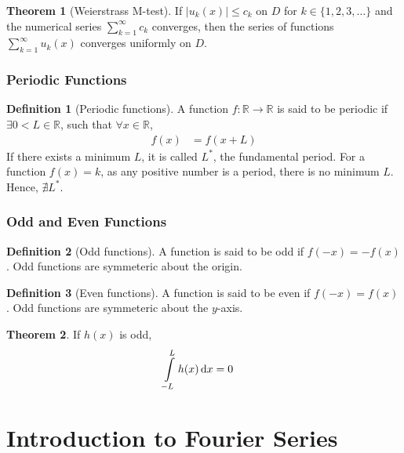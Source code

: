 \documentclass[fleqn, a4paper, 12pt, twoside]{article}
\theoremstyle{definition}
\newtheorem{definition}{Definition}
\theoremstyle{theorem}
\newtheorem{theorem}{Theorem}
\begin{document}
\begin{theorem}[Weierstrass M-test]
	If $|u_k(x)| \le c_k$ on $D$ for $k \in \{ 1, 2, 3, \dots \}$ and the numerical series $\sum\limits_{k = 1}^{\infty} c_k$ converges, then the series of functions $\sum\limits_{k = 1}^{\infty} u_k(x)$ converges uniformly on $D$.
	\label{Weierstrass_M-test}
\end{theorem}

\section{Periodic Functions}

\begin{definition}[Periodic functions]
	A function $f : \mathbb{R} \to \mathbb{R}$ is said to be periodic if $\exists 0 < L \in \mathbb{R}$, such that $\forall x \in \mathbb{R}$,
	\begin{align*}
		f(x) & = f(x + L)
	\end{align*}
	If there exists a minimum $L$, it is called $L^*$, the fundamental period.
	\marginnote
	{
		For a function $f(x) = k$, as any positive number is a period, there is no minimum $L$.
		Hence, $\nexists L^*$.
	}
\end{definition}

\section{Odd and Even Functions}


\begin{definition}[Odd functions]
	A function is said to be odd if $f(-x) = -f(x)$.
	\marginnote
	{
		Odd functions are symmeteric about the origin.
	}
\end{definition}

\begin{definition}[Even functions]
	A function is said to be even if $f(-x) = f(x)$.
	\marginnote
	{
		Odd functions are symmeteric about the $y$-axis.
	}
\end{definition}

\begin{theorem}
	If $h(x)$ is odd,
	\begin{align*}
		\int\limits_{-L}^{L} h(x) \dif x & = 0
	\end{align*}
\end{theorem}

\newpage
\part{Introduction to Fourier Series}
\end{document}
